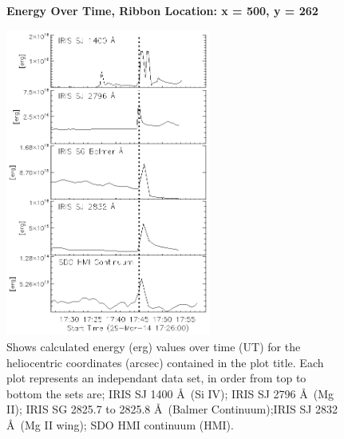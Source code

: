 \begin{figure}[H]
  \begin{center}
  \textbf{Energy Over Time, Ribbon Location: x = 500, y = 262 }\par\medskip
  \includegraphics[width=0.6\textwidth]{29-Mar-14-Ribbon-xyPosition-500-262-Frame-1-Energy-Ladder}
  \end{center}
  \caption{Shows calculated energy (erg) values over time (UT) for the heliocentric coordinates (arcsec) contained in the plot title. Each plot represents an independant data set, in order from top to bottom the sets are; IRIS SJ 1400 \AA\ (Si IV); IRIS SJ 2796 \AA\ (Mg II); IRIS SG  2825.7 to 2825.8 \AA\ (Balmer Continuum);IRIS SJ 2832 \AA\ (Mg II wing); SDO HMI continuum (HMI).}\label{erb6}
\end{figure}

